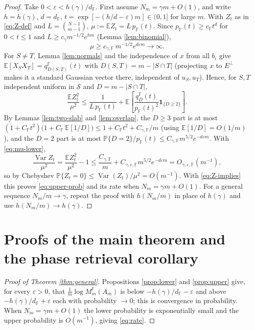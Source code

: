 \documentclass[preprint,12pt]{elsarticle}
\newcommand{\F}{\mathbb{F}}
\newcommand{\PP}{\mathbb{P}}
\newcommand{\EE}{\mathbb{E}}
\newcommand{\cS}{\mathcal{S}}
\begin{document}
\begin{proof}
Take $0<\varepsilon<h(\gamma)/d_\F$. First assume $N_m=\gamma m+O(1)$, and write $h=h(\gamma)$,
$d=d_\F$, $t=\exp[-(h/d-\varepsilon)m]\in(0,1]$ for large $m$. With $Z_t$ as in \eqref{eq:Z-def} and
$L=\binom{N-1}{m-1}$, $\mu:=\EE Z_t=L\,p_\F(t)$. Since $p_\F(t)\ge c_\F t^d$ for $0<t\le1$ and
$L\ge c_\gamma m^{-1/2}e^{hm}$ (Lemma \ref{lem:binomial}),
\begin{equation}\label{eq:mu-lower}
  \mu\ge c_{\gamma,\F}\,m^{-1/2}e^{d\varepsilon m}\to\infty.
\end{equation}
For $S\ne T$, Lemma \ref{lem:normals} and the independence of $x$ from all $b_i$ give
$\EE[X_SX_T]=q_{D(S,T)}^\F(t)$ with $D(S,T)=m-|S\cap T|$ (projecting $x$ to $E^\perp$ makes it a
standard Gaussian vector there, independent of $u_S,u_T$). Hence, for $S,T$ independent uniform in
$\cS$ and $D=m-|S\cap T|$,
\begin{equation}\label{eq:second-moment}
  \frac{\EE Z_t^2}{\mu^2}
  \le \frac{1}{L\,p_\F(t)}+
       \EE\left[\frac{q_D^\F(t)}{p_\F(t)^2}\mathbf1_{\{D\ge2\}}\right].
\end{equation}
By Lemmas \ref{lem:two-slab} and \ref{lem:overlap}, the $D\ge3$ part is at most
$(1+C_\F t^2)\bigl(1+C_\F\,\EE[1/D]\bigr)\le 1+C_\F t^2+C_{\gamma,\F}/m$ (using
$\EE[1/D]=O(1/m)$), and the $D=2$ part is at most
$\PP\{D=2\}/p_\F(t)\le C_{\gamma,\F}m^{5/2}e^{-d\varepsilon m}$. With \eqref{eq:mu-lower},
\[
  \frac{\operatorname{Var} Z_t}{\mu^2}=\frac{\EE Z_t^2}{\mu^2}-1
  \le \frac{C_{\gamma,\F}}{m}+C_{\gamma,\varepsilon,\F}m^{5/2}e^{-d\varepsilon m}
  =O_{\gamma,\varepsilon,\F}(m^{-1}),
\]
so by Chebyshev $\PP\{Z_t=0\}\le \operatorname{Var}(Z_t)/\mu^2=O(m^{-1})$. With \eqref{eq:Z-implies}
this proves \eqref{eq:upper-prob} and its rate when $N_m=\gamma m+O(1)$. For a general sequence
$N_m/m\to\gamma$, repeat the proof with $h(N_m/m)$ in place of $h(\gamma)$ and use
$h(N_m/m)\to h(\gamma)$.
\end{proof}

\section{Proofs of the main theorem and the phase retrieval corollary}

\begin{proof}[Proof of Theorem \ref{thm:general}]
Propositions \ref{prop:lower} and \ref{prop:upper} give, for every $\varepsilon>0$, that
$\frac1m\log M_m^\F(A_m)$ is below $-h(\gamma)/d_\F-\varepsilon$ and above $-h(\gamma)/d_\F+\varepsilon$
each with probability $\to0$; this is convergence in probability. When $N_m=\gamma m+O(1)$ the lower
probability is exponentially small and the upper probability is $O(m^{-1})$, giving \eqref{eq:rate}.
\end{proof}
\end{document}
